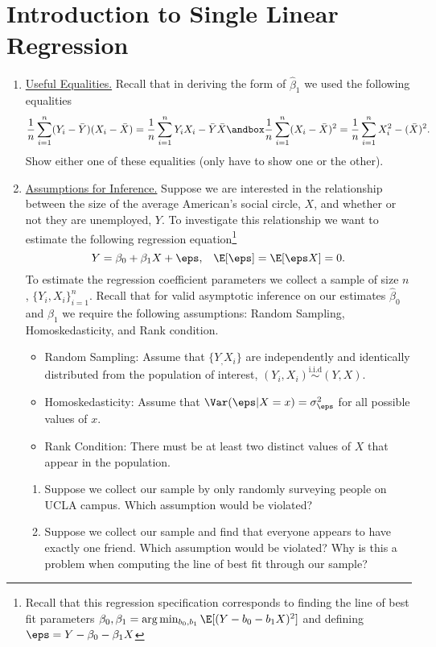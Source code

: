 \documentclass[10pt]{article}
\begin{document}
\section*{Introduction to Single Linear Regression}%
\begin{enumerate}
	\item \underline{Useful Equalities.}  Recall that in deriving the form of \(\hat\beta_1\) we used the following equalities
	\[
		\frac{1}{n}\sum_{i=1}^n (Y_i - \bar Y)(X_i - \bar X) = \frac{1}{n}\sum_{i=1}^n Y_iX_i - \bar Y \bar X \andbox \frac{1}{n}\sum_{i=1}^n (X_i - \bar X)^2 = \frac{1}{n}\sum_{i=1}^n  X_i^2 - (\bar X)^2
	.\] 
	Show either one of these equalities (only have to show one or the other).
	\item \underline{Assumptions for Inference.} Suppose we are interested in the relationship between the size of the average American's social circle, \(X\), and whether or not they are unemployed, \(Y\). To investigate this relationship we want to estimate the following regression equation\footnote{Recall that this regression specification corresponds to finding the line of best fit parameters \(\beta_0, \beta_1 = \arg\min_{b_0,b_1}\E[(Y-b_0-b_1X)^2]\) and defining \(\eps = Y -\beta_0 - \beta_1X\)}
	\[
		Y = \beta_0 + \beta_1X + \eps,\;\;\; \E[\eps] = \E[\eps X] = 0
	.\] 
	To estimate the regression coefficient parameters we collect a sample of size \(n\), \(\{Y_i,X_i\}_{i=1}^{n}\). Recall that for valid asymptotic inference on our estimates \(\hat\beta_0\) and \(\hat\beta_1\) we require the following assumptions: Random Sampling, Homoskedasticity, and Rank condition.
	\begin{itemize}
		\item Random Sampling: Assume that \(\{Y_,X_i\}\) are independently and identically distributed from the population of interest, \((Y_i,X_i) \overset{\text{i.i.d}}{\sim} (Y,X)\).
		\item Homoskedasticity: Assume that \(\Var(\eps|X=x)=\sigma_\eps^2\) for all possible values of  \(x\).
		 \item Rank Condition: There must be at least two distinct values of \(X\) that appear in the population.
	 \end{itemize}
	\begin{enumerate}
		\item Suppose we collect our sample by only randomly surveying people on UCLA campus. Which assumption would be violated?
		\item Suppose we collect our sample and find that everyone appears to have exactly one friend. Which assumption would be violated? Why is this a problem when computing the line of best fit through our sample?

\end{enumerate}
\end{enumerate}
\end{document}

